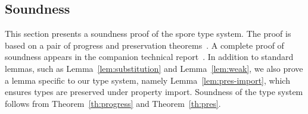 \documentclass{llncs}
\newcommand{\seq}[1]{\overline{#1}}
\begin{document}
\vspace{-5mm}

\subsection{Soundness}\label{sec:soundness}

This section presents a soundness proof of the spore type system. The proof is based on a pair of progress and preservation theorems~\cite{WrightF94}. A complete proof of soundness appears in the companion technical report~\cite{SporesFormally}. In addition to standard lemmas, such as Lemma~\ref{lem:substitution} and Lemma~\ref{lem:weak}, we also prove a lemma specific to our type system, namely Lemma~\ref{lem:pres-import}, which ensures types are preserved under property import. Soundness of the type system follows from Theorem~\ref{th:progress} and Theorem~\ref{th:pres}.






\end{document}
